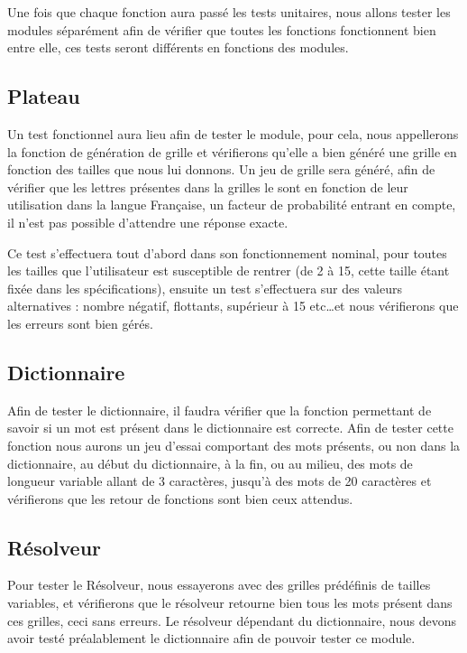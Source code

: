 \documentclass[12pt,a4paper,openany]{article}
\begin{document}
	Une fois que chaque fonction aura passé les tests unitaires, nous allons tester les modules séparément afin de vérifier que toutes les fonctions fonctionnent
	bien entre elle, ces tests seront différents en fonctions des modules.

	\subsection{Plateau}
		Un test fonctionnel aura lieu afin de tester le module, pour cela, nous appellerons la fonction de génération de grille et vérifierons qu'elle a bien
		généré une grille en fonction des tailles que nous lui donnons. Un jeu de grille sera généré, afin de vérifier que les lettres présentes dans la grilles
		le sont en fonction de leur utilisation dans la langue Française, un facteur de probabilité entrant en compte, il n'est pas possible d'attendre une
		réponse exacte.

		Ce test s'effectuera tout d'abord dans son fonctionnement nominal, pour toutes les tailles que l'utilisateur est susceptible de rentrer (de 2 à 15, cette
		taille étant fixée dans les spécifications), ensuite un test s'effectuera sur des valeurs alternatives : nombre négatif, flottants, supérieur à 15
		etc\ldots et nous vérifierons que les erreurs sont bien gérés.
	\subsection{Dictionnaire}
		Afin de tester le dictionnaire, il faudra vérifier que la fonction permettant de savoir si un mot est présent dans le
		dictionnaire est correcte. Afin de tester cette fonction nous aurons un jeu d'essai comportant des mots présents, ou non dans la dictionnaire, au début
		du dictionnaire, à la fin, ou au milieu, des mots de longueur variable allant de 3 caractères, jusqu'à des mots de 20 caractères  
		et vérifierons que les retour de fonctions sont bien ceux attendus.

	\subsection{Résolveur}
		Pour tester le Résolveur, nous essayerons avec des grilles prédéfinis de tailles variables, et vérifierons que le résolveur retourne bien tous les
		mots présent dans ces grilles, ceci sans erreurs. Le résolveur dépendant du dictionnaire, nous devons avoir testé préalablement le dictionnaire afin de
		pouvoir tester ce module.
\end{document}
